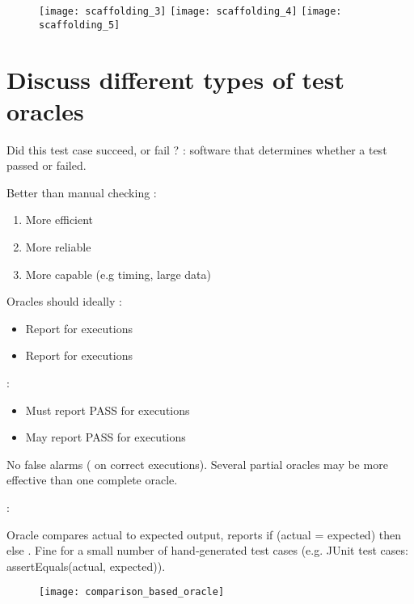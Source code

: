 \begin{figure}[H]
    \centering
    \texttt{[image: scaffolding\_3]}\hfill
    \texttt{[image: scaffolding\_4]}\hfill
    \texttt{[image: scaffolding\_5]}
\end{figure}

\newpage
\section{Discuss different types of test oracles}

Did this test case succeed, or fail ?  : software that determines whether a test passed or failed.

Better than manual checking :
\begin{enumerate}
    \item More efficient
    \item More reliable
    \item More capable (e.g timing, large data)
\end{enumerate}
Oracles should ideally :
\begin{itemize}
    \item Report  for   executions
    \item Report  for   executions
\end{itemize}

 :
\begin{itemize}
    \item Must report PASS for  executions
    \item May report PASS for  executions
\end{itemize}
No false alarms ( on correct executions). Several partial oracles may be more effective than one complete oracle.
    
 :

\begin{minipage}{0.58\textwidth}
    Oracle compares actual to expected output, reports if (actual = expected) then  else . Fine for a small number of hand‐generated test cases (e.g. JUnit test cases: assertEquals(actual, expected)).
\end{minipage}
\hfill
\begin{minipage}{0.40\textwidth}
    \begin{figure}[H]
        \centering
        \texttt{[image: comparison\_based\_oracle]}
    \end{figure}
\end{minipage}
   
